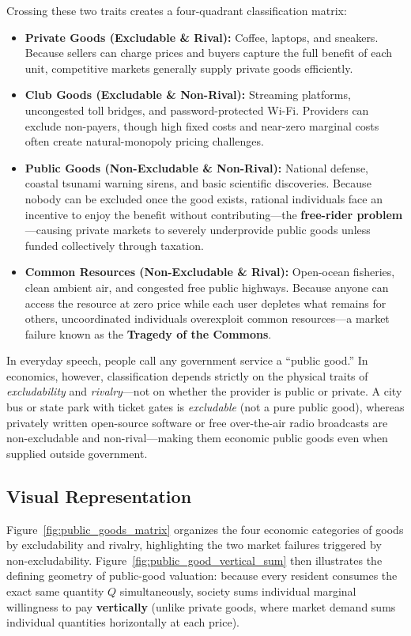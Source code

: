 \documentclass[11pt,letterpaper]{article}
\begin{document}
Crossing these two traits creates a four-quadrant classification matrix:
\begin{itemize}
    \item \textbf{Private Goods (Excludable \& Rival):} Coffee, laptops, and sneakers. Because sellers can charge prices and buyers capture the full benefit of each unit, competitive markets generally supply private goods efficiently.
    \item \textbf{Club Goods (Excludable \& Non-Rival):} Streaming platforms, uncongested toll bridges, and password-protected Wi-Fi. Providers can exclude non-payers, though high fixed costs and near-zero marginal costs often create natural-monopoly pricing challenges.
    \item \textbf{Public Goods (Non-Excludable \& Non-Rival):} National defense, coastal tsunami warning sirens, and basic scientific discoveries. Because nobody can be excluded once the good exists, rational individuals face an incentive to enjoy the benefit without contributing—the \textbf{free-rider problem}—causing private markets to severely underprovide public goods unless funded collectively through taxation.
    \item \textbf{Common Resources (Non-Excludable \& Rival):} Open-ocean fisheries, clean ambient air, and congested free public highways. Because anyone can access the resource at zero price while each user depletes what remains for others, uncoordinated individuals overexploit common resources—a market failure known as the \textbf{Tragedy of the Commons}.
\end{itemize}

\begin{tcolorbox}[colback=CourseAmber!10!white,colframe=CourseOrange!85!black,title=\textbf{Clear It Up: ``Public Goods'' Does Not Mean ``Government-Provided Goods''}]
In everyday speech, people call any government service a ``public good.'' In economics, however, classification depends strictly on the physical traits of \emph{excludability} and \emph{rivalry}—not on whether the provider is public or private. A city bus or state park with ticket gates is \emph{excludable} (not a pure public good), whereas privately written open-source software or free over-the-air radio broadcasts are non-excludable and non-rival—making them economic public goods even when supplied outside government.
\end{tcolorbox}

\subsection*{Visual Representation}
Figure~\ref{fig:public_goods_matrix} organizes the four economic categories of goods by excludability and rivalry, highlighting the two market failures triggered by non-excludability. Figure~\ref{fig:public_good_vertical_sum} then illustrates the defining geometry of public-good valuation: because every resident consumes the exact same quantity $Q$ simultaneously, society sums individual marginal willingness to pay \textbf{vertically} (unlike private goods, where market demand sums individual quantities horizontally at each price).
\end{document}
